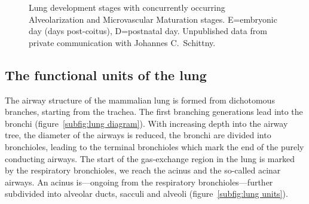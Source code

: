 \begin{figure}
	\noindent\makebox[\textwidth]{%
		\centering%
		}%
	\caption[Lung development stages]{Lung development stages with concurrently occurring Alveolarization and Microvascular Maturation stages. E=embryonic day (days post-coitus), D=postnatal day. Unpublished data from private communication with Johannes C.\ Schittny.}
	\label{fig:lung development stages new}
\end{figure}

\subsection{The functional units of the lung}
The airway structure of the mammalian lung is formed from dichotomous branches, starting from the trachea. The first branching generations lead into the bronchi (figure~\ref{subfig:lung diagram}). With increasing depth into the airway tree, the diameter of the airways is reduced, the bronchi are divided into bronchioles, leading to the terminal bronchioles which mark the end of the purely conducting airways. The start of the gas-exchange region in the lung is marked by the respiratory bronchioles, we reach the acinus and the so-called acinar airways. An acinus is---ongoing from the respiratory bronchioles---further subdivided into alveolar ducts, sacculi and alveoli (figure~\ref{subfig:lung units}).

